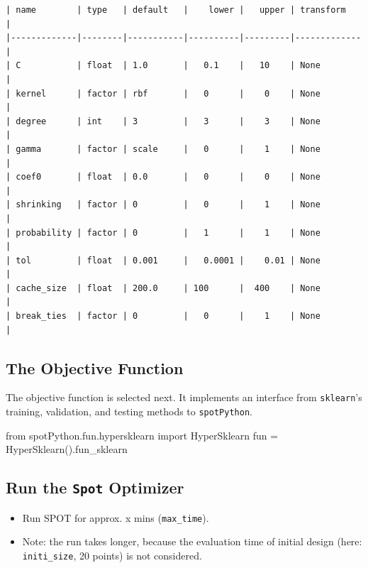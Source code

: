 \documentclass[
  letterpaper,
  DIV=11,
  numbers=noendperiod]{scrreprt}
\newenvironment{Shaded}{\begin{snugshade}}{\end{snugshade}}
\newcommand{\ImportTok}[1]{\textcolor[rgb]{0.00,0.46,0.62}{#1}}
\newcommand{\NormalTok}[1]{\textcolor[rgb]{0.00,0.23,0.31}{#1}}
\newcommand{\OperatorTok}[1]{\textcolor[rgb]{0.37,0.37,0.37}{#1}}
\providecommand{\tightlist}{%
  \setlength{\itemsep}{0pt}\setlength{\parskip}{0pt}}\usepackage{longtable,booktabs,array}
\begin{document}
\begin{verbatim}
| name        | type   | default   |    lower |   upper | transform   |
|-------------|--------|-----------|----------|---------|-------------|
| C           | float  | 1.0       |   0.1    |   10    | None        |
| kernel      | factor | rbf       |   0      |    0    | None        |
| degree      | int    | 3         |   3      |    3    | None        |
| gamma       | factor | scale     |   0      |    1    | None        |
| coef0       | float  | 0.0       |   0      |    0    | None        |
| shrinking   | factor | 0         |   0      |    1    | None        |
| probability | factor | 0         |   1      |    1    | None        |
| tol         | float  | 0.001     |   0.0001 |    0.01 | None        |
| cache_size  | float  | 200.0     | 100      |  400    | None        |
| break_ties  | factor | 0         |   0      |    1    | None        |
\end{verbatim}

\hypertarget{sec-the-objective-function-18}{%
\subsection{The Objective
Function}\label{sec-the-objective-function-18}}

The objective function is selected next. It implements an interface from
\texttt{sklearn}'s training, validation, and testing methods to
\texttt{spotPython}.

\begin{Shaded}
\begin{Highlighting}[]
\ImportTok{from}\NormalTok{ spotPython.fun.hypersklearn }\ImportTok{import}\NormalTok{ HyperSklearn}
\NormalTok{fun }\OperatorTok{=}\NormalTok{ HyperSklearn().fun\_sklearn}
\end{Highlighting}
\end{Shaded}

\hypertarget{run-the-spot-optimizer-3}{%
\subsection{\texorpdfstring{Run the \texttt{Spot}
Optimizer}{Run the Spot Optimizer}}\label{run-the-spot-optimizer-3}}

\begin{itemize}
\tightlist
\item
  Run SPOT for approx. x mins (\texttt{max\_time}).
\item
  Note: the run takes longer, because the evaluation time of initial
  design (here: \texttt{initi\_size}, 20 points) is not considered.
\end{itemize}
\end{document}
